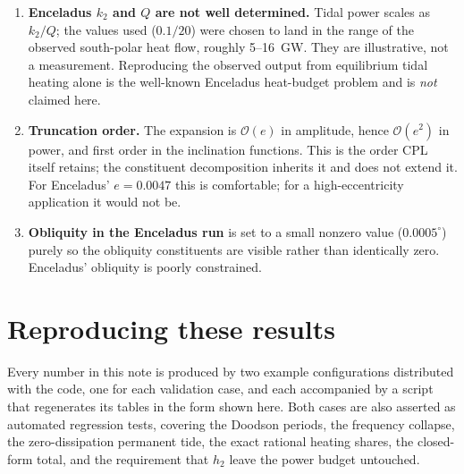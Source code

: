 \documentclass[11pt]{article}
\begin{document}
\begin{enumerate}
\item \textbf{Enceladus $k_2$ and $Q$ are not well determined.} Tidal power
scales as $k_2/Q$; the values used ($0.1/20$) were chosen to land in the range
of the observed south-polar heat flow, roughly 5--16~GW. They are
illustrative, not a measurement. Reproducing the observed output from
equilibrium tidal heating alone is the well-known Enceladus heat-budget
problem and is \emph{not} claimed here.

\item \textbf{Truncation order.} The expansion is $\mathcal{O}(e)$ in
amplitude, hence $\mathcal{O}(e^2)$ in power, and first order in the
inclination functions. This is the order CPL itself retains; the constituent
decomposition inherits it and does not extend it. For Enceladus' $e=0.0047$
this is comfortable; for a high-eccentricity application it would not be.

\item \textbf{Obliquity in the Enceladus run} is set to a small nonzero value
($0.0005^\circ$) purely so the obliquity constituents are visible rather than
identically zero. Enceladus' obliquity is poorly constrained.
\end{enumerate}

\section*{Reproducing these results}

Every number in this note is produced by two example configurations
distributed with the code, one for each validation case, and each accompanied
by a script that regenerates its tables in the form shown here. Both cases are
also asserted as automated regression tests, covering the Doodson periods, the
frequency collapse, the zero-dissipation permanent tide, the exact rational
heating shares, the closed-form total, and the requirement that $h_2$ leave
the power budget untouched.
\end{document}
